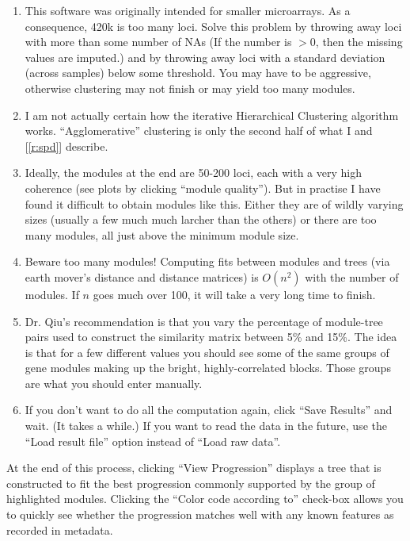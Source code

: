 \documentclass[]{article}
\begin{document}
  \begin{enumerate}
    \item This software was originally intended for smaller microarrays. As a consequence, 420k is too many loci. Solve this problem by throwing away loci with more than some number of NAs (If the number is $>$0, then the missing values are imputed.) and by throwing away loci with a standard deviation (across samples) below some threshold. You may have to be aggressive, otherwise clustering may not finish or may yield too many modules.
    
    \item I am not actually certain how the iterative Hierarchical Clustering algorithm works. ``Agglomerative'' clustering is only the second half of what I and [\ref{r:spd}] describe.

    \item Ideally, the modules at the end are 50-200 loci, each with a very high coherence (see plots by clicking ``module quality''). But in practise I have found it difficult to obtain modules like this. Either they are of wildly varying sizes (usually a few much much larcher than the others) or there are too many modules, all just above the minimum module size.

    \item Beware too many modules! Computing fits between modules and trees (via earth mover's distance and distance matrices) is $O(n^{2})$ with the number of modules. If $n$ goes much over 100, it will take a very long time to finish.

    \item Dr. Qiu's recommendation is that you vary the percentage of module-tree pairs used to construct the similarity matrix between 5\% and 15\%. The idea is that for a few different values you should see some of the same groups of gene modules making up the bright, highly-correlated blocks. Those groups are what you should enter manually.

    \item If you don't want to do all the computation again, click ``Save Results'' and wait. (It takes a while.) If you want to read the data in the future, use the ``Load result file'' option instead of ``Load raw data''.
  \end{enumerate}

  At the end of this process, clicking ``View Progression'' displays a tree that is constructed to fit the best progression commonly supported by the group of highlighted modules. Clicking the ``Color code according to'' check-box allows you to quickly see whether the progression matches well with any known features as recorded in metadata.
\end{document}
